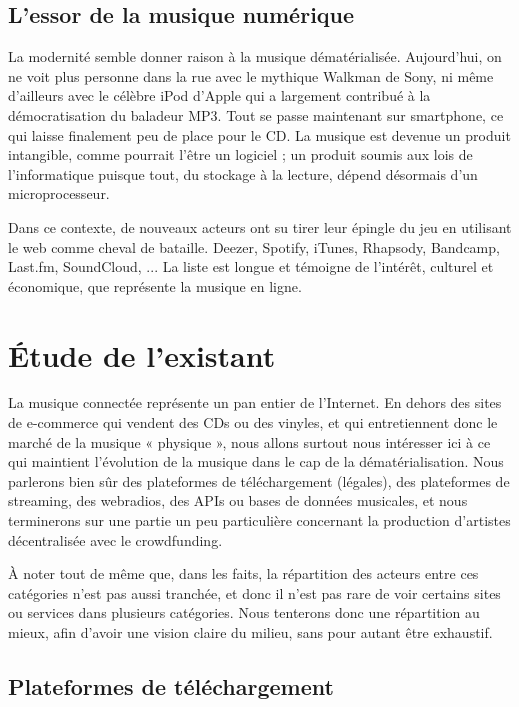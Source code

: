 \documentclass[a4paper,12pt]{article}
\begin{document}
\subsection{L'essor de la musique numérique}

La modernité semble donner raison à la musique dématérialisée. Aujourd'hui, on ne voit plus personne dans la rue avec le mythique Walkman de Sony, ni même d'ailleurs avec le célèbre iPod d'Apple qui a largement contribué à la démocratisation du baladeur MP3. Tout se passe maintenant sur smartphone, ce qui laisse finalement peu de place pour le CD. La musique est devenue un produit intangible, comme pourrait l'être un logiciel ; un produit soumis aux lois de l'informatique puisque tout, du stockage à la lecture, dépend désormais d'un microprocesseur.

Dans ce contexte, de nouveaux acteurs ont su tirer leur épingle du jeu en utilisant le web comme cheval de bataille. Deezer, Spotify, iTunes, Rhapsody, Bandcamp, Last.fm, SoundCloud, ... La liste est longue et témoigne de l'intérêt, culturel et économique, que représente la musique en ligne.

\section{Étude de l'existant}

La musique connectée représente un pan entier de l'Internet. En dehors des sites de e-commerce qui vendent des CDs ou des vinyles, et qui entretiennent donc le marché de la musique « physique », nous allons surtout nous intéresser ici à ce qui maintient l'évolution de la musique dans le cap de la dématérialisation. Nous parlerons bien sûr des plateformes de téléchargement (légales), des plateformes de streaming, des webradios, des APIs ou bases de données musicales, et nous terminerons sur une partie un peu particulière concernant la production d'artistes décentralisée avec le crowdfunding.

À noter tout de même que, dans les faits, la répartition des acteurs entre ces catégories n'est pas aussi tranchée, et donc il n'est pas rare de voir certains sites ou services dans plusieurs catégories. Nous tenterons donc une répartition au mieux, afin d'avoir une vision claire du milieu, sans pour autant être exhaustif.

\subsection{Plateformes de téléchargement}
\end{document}
